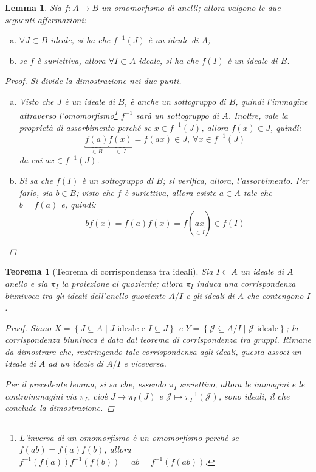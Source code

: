 \documentclass[11pt]{scrartcl}
\theoremstyle{style1}
\newtheorem{teorema}{Teorema}[section]
\newtheorem{lemma}{Lemma}[teorema]
\numberwithin{equation}{subsection}
\begin{document}
\begin{lemma}
	Sia $f: A\to B$ un omomorfismo di anelli; allora valgono le due seguenti affermazioni:
\begin{enumerate}[(a).]
	\item $\forall J \subset B$ ideale, si ha che $f^{-1}(J)$ \`e un ideale di $A$;
	\item se $f$ \`e suriettiva, allora $\forall I \subset A$ ideale, si ha che $f(I)$ \`e un ideale di $B$.
\end{enumerate}
		\begin{proof}
			Si divide la dimostrazione nei due punti.
			\begin{enumerate}[(a).]
				\item Visto che $J$ \`e un ideale di $B$, \`e anche un sottogruppo di $B$, quindi l'immagine attraverso l'omomorfismo\footnote{L'inversa di un omomorfismo \`e un omomorfismo perch\'e se $f(ab) = f(a)f(b)$, allora $f^{-1}(f(a)) f^{-1}(f(b)) =ab= f^{-1}(f(ab))$.} $f^{-1}$ sar\`a un sottogruppo di $A$.
					Inoltre, vale la propriet\`a di assorbimento perch\'e se $x \in f^{-1}(J)$, allora $f(x) \in J$, quindi:
					\[
						\underbracket{f(a)}_{\in B} \underbracket{f(x)}_{\in J}  = f(ax) \in J, \ \forall x \in f^{-1}(J)
					\] 
					da cui $ax \in f^{-1}(J)$.
				\item Si sa che $f(I)$ \`e un sottogruppo di $B$; si verifica, allora, l'assorbimento. 
					Per farlo, sia $b \in B$; visto che $f$ \`e suriettiva, allora esiste $a \in A $ tale che $b = f(a)$ e, quindi:
					\[
						b f(x) = f(a) f(x) = f(\underbracket{ax}_{\in I} ) \in f(I)
					\] 
			\end{enumerate}
		\end{proof}
\end{lemma}
\begin{teorema}
	[Teorema di corrispondenza tra ideali]
	Sia $I \subset A$ un ideale di $A$ anello e sia $\pi_I$ la proiezione al quoziente; allora $\pi_I$ induca una corrispondenza biunivoca tra gli ideali dell'anello quoziente $A / I$ e gli ideali di $A$ che contengono $I$.
	\begin{proof}
		Siano $X = \left\{ J \subseteq A  \mid J \text{ ideale e } I \subseteq J\right\} $ e $Y = \left\{ \mathcal{J} \subseteq A / I  \mid \mathcal{J} \text{ ideale} \right\} $; la corrispondenza biunivoca \`e data dal teorema di corrispondenza tra gruppi. 
		Rimane da dimostrare che, restringendo tale corrispondenza agli ideali, questa associ un ideale di $A$ ad un ideale di $A / I$ e viceversa.

		Per il precedente lemma, si sa che, essendo $\pi_I$ suriettivo, allora le immagini e le controimmagini via $\pi_I$, cio\`e $J \longmapsto \pi_I (J)$ e $ \mathcal{J} \longmapsto \pi^{-1}_I(\mathcal{J} )$, sono ideali, il che conclude la dimostrazione.
	\end{proof}
\end{teorema}
\end{document}
